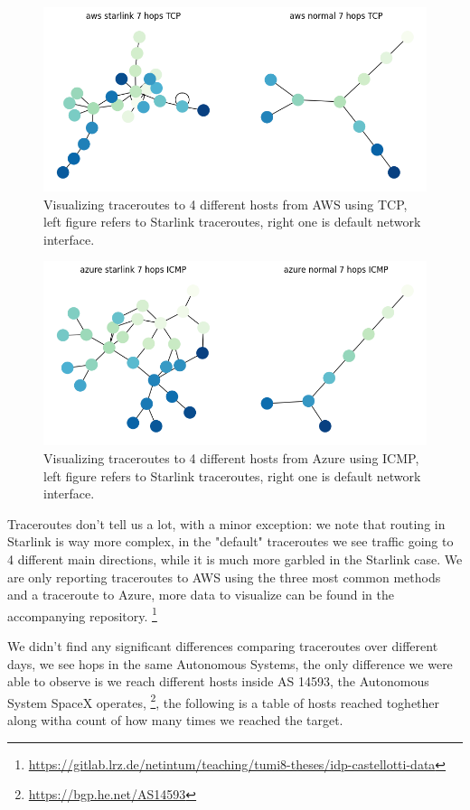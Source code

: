 \documentclass[IN,11pt,twoside,openright,bachelor,english]{tumthesis}
\begin{document}
\begin{figure}
	\label{fig:tr_aws_tcp}
	\centering
	\includegraphics[width=0.6\columnwidth]{img/tr_aws_tcp.png}
	\caption{Visualizing traceroutes to 4 different hosts from AWS using TCP, left figure refers to Starlink traceroutes, right one is default network interface.}
\end{figure}

\begin{figure}
	\label{fig:tr_azure_icmp}
	\centering
	\includegraphics[width=0.6\columnwidth]{img/tr_azure_icmp.png}
	\caption{Visualizing traceroutes to 4 different hosts from Azure using ICMP, left figure refers to Starlink traceroutes, right one is default network interface.}
\end{figure}

Traceroutes don't tell us a lot, with a minor exception: we note that routing in Starlink is way more complex, in the "default" traceroutes we see traffic going to 4 different main directions, while it is much more garbled in the Starlink case. We are only reporting traceroutes to AWS using the three most common methods and a traceroute to Azure, more data to visualize can be found in the accompanying repository. \footnote{\url{https://gitlab.lrz.de/netintum/teaching/tumi8-theses/idp-castellotti-data}}

We didn't find any significant differences comparing traceroutes over different days, we see hops in the same Autonomous Systems, the only difference we were able to observe is we reach different hosts inside AS 14593, the Autonomous System SpaceX operates, \footnote{\url{https://bgp.he.net/AS14593}}, the following is a table of hosts reached toghether along witha count of how many times we reached the target.
\end{document}
